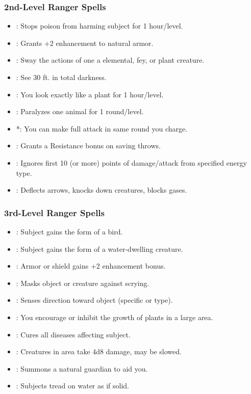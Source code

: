 \subsubsection{2nd-Level Ranger Spells}
\begin{itemize}
\item {}: Stops poison from harming subject for 1 hour/level.
\item {}: Grants +2 enhancement to natural armor.
\item {}: Sway the actions of one a elemental, fey, or plant creature.
\item {}: See 30 ft. in total darkness.
\item {}: You look exactly like a plant for 1 hour/level.
\item {}: Paralyzes one animal for 1 round/level.
\item {}*: You can make full attack in same round you charge.
\item {}: Grants a Resistance bonus on saving throws.
\item {}: Ignores first 10 (or more) points of damage/attack from specified energy type.
\item {}: Deflects arrows, knocks down creatures, blocks gases.
\end{itemize}
\subsubsection{3rd-Level Ranger Spells}
\begin{itemize}
\item {}: Subject gains the form of a bird.
\item {}: Subject gains the form of a water-dwelling creature.
\item {}: Armor or shield gains +2 enhancement bonus.
\item {}: Masks object or creature against scrying.
\item {}: Senses direction toward object (specific or type).
\item {}: You encourage or inhibit the growth of plants in a large area.
\item {}: Cures all diseases affecting subject.
\item {}: Creatures in area take 4d8 damage, may be slowed.
\item {}: Summons a natural guardian to aid you.
\item {}: Subjects tread on water as if solid.
\end{itemize}
